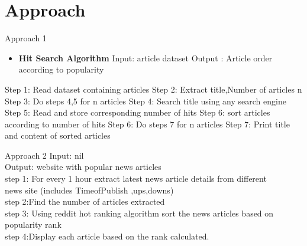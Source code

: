 \documentclass{beamer}
\begin{document}
	\section{Approach}
	\begin{frame}{Approach 1}
		\begin{itemize}
			\item \Large \textbf{Hit Search Algorithm}
			  \newline Input: article dataset
			   \newline Output : Article order according to popularity
		\end{itemize}
		\Large{Step 1: Read dataset containing articles \newline
		Step 2: Extract title,Number of articles n \newline
		Step 3: Do steps 4,5 for n articles \newline
		Step 4: Search title using any search engine \newline
		Step 5: Read and store corresponding number of hits \newline
		Step 6: sort articles according to number of hits \newline
		Step 6: Do steps 7 for n articles \newline
		Step 7: Print title and content of sorted articles}
		
	\end{frame}
	\begin{frame}{Approach 2}
	\footnotesize
	\Large{Input: nil \\
	Output: website with popular news articles\\}
	\vspace{.2cm}
	\footnotesize
	\Large{step 1: For every 1 hour extract latest news article details from different\\ \hspace{1.2mm} news site 
	(includes TimeofPublish ,ups,downs)\\
	step 2:Find the number of articles extracted\\
	step 3: Using reddit hot ranking algorithm sort the news articles based on popularity rank\\
	step 4:Display each article based on the rank calculated.\\}
	\vspace{0.5cm}
	\end{frame}
\end{document}

